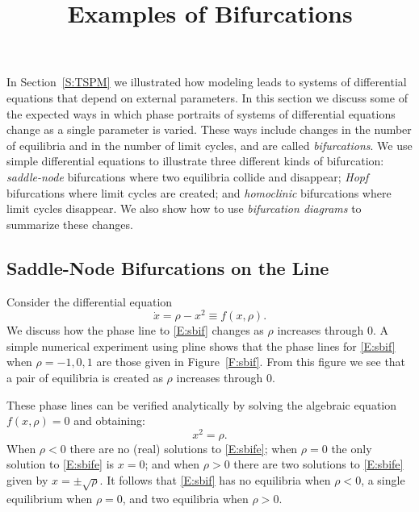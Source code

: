 \documentclass{ximera}
\title{Examples of Bifurcations}
\begin{document}
\begin{abstract}
\end{abstract}
\maketitle


\label{S:bifurcation} 

In Section~\ref{S:TSPM} we illustrated how modeling leads to systems 
of differential equations that depend on external parameters.  In this 
section we discuss some of the expected ways in which phase portraits of 
systems of differential equations change as a single parameter is varied.  
These ways include changes in the number of equilibria and in the number 
of limit cycles, and are called {\em bifurcations\/}.   We use simple 
differential equations to illustrate three different kinds of bifurcation: 
{\em saddle-node\/} bifurcations where two equilibria collide and disappear; 
{\em Hopf\/} bifurcations where limit cycles are created; and 
{\em homoclinic\/} bifurcations where limit cycles disappear.  We also show 
how to use {\em bifurcation diagrams\/} to summarize these changes.

\subsection*{Saddle-Node Bifurcations on the Line}

Consider the differential equation
\begin{equation}  \label{E:sbif}
\dot{x} = \rho - x^2 \equiv f(x,\rho).
\end{equation}
We discuss how the phase line to \eqref{E:sbif} changes as $\rho$ increases 
through $0$.  A simple numerical experiment using {\sf pline} shows that
the phase lines for \eqref{E:sbif} when $\rho=-1,0,1$ are those given in 
Figure~\ref{F:sbif}.  From this figure we see that a pair of equilibria 
is created as $\rho$ increases through $0$.

\vspace{0.4in}

\begin{figure*}[htb]
           \centerline{%
           }
           \caption{Phase lines for the differential equation 
    		\protect\eqref{E:sbif}.}
           \label{F:sbif}
\end{figure*}


These phase lines can be verified analytically by solving the 
algebraic equation $f(x,\rho)=0$ and obtaining:
\begin{equation} \label{E:sbife}
x^2 = \rho.
\end{equation}
When $\rho<0$ there are no (real) solutions to \eqref{E:sbife}; when
$\rho=0$ the only solution to \eqref{E:sbife} is $x=0$; and when $\rho>0$
there are two solutions to \eqref{E:sbife} given by $x=\pm\sqrt{\rho}$.
It follows that \eqref{E:sbif} has no equilibria when $\rho<0$, a single
equilibrium when $\rho=0$, and two equilibria when $\rho>0$.
\end{document}
